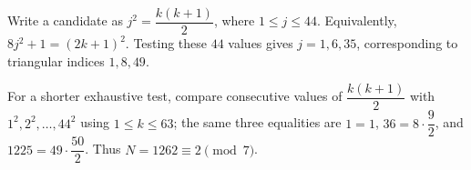 Write a candidate as $j^2=\dfrac{k(k+1)}{2}$, where $1\le j\le44$. Equivalently, $8j^2+1=(2k+1)^2$. Testing these $44$ values gives $j=1,6,35$, corresponding to triangular indices $1,8,49$.

For a shorter exhaustive test, compare consecutive values of $\dfrac{k(k+1)}{2}$ with $1^2,2^2,\ldots,44^2$ using $1\le k\le63$; the same three equalities are $1=1$, $36=8\cdot\dfrac{9}{2}$, and $1225=49\cdot\dfrac{50}{2}$. Thus $N=1262\equiv\boxed2\pmod7$.
